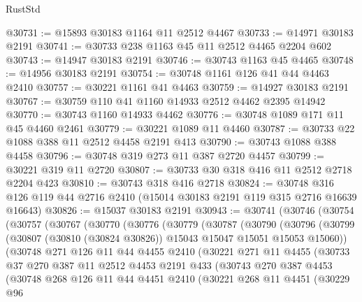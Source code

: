 \begin{lexlean}{RustStd}
\begin{coremodule}
@30731 := @15893 @30183 @1164 @11 @2512 @4467
@30733 := @14971 @30183 @2191
@30741 := @30733 @238 @1163 @45 @11 @2512 @4465 @2204 @602
@30743 := @14947 @30183 @2191
@30746 := @30743 @1163 @45 @4465
@30748 := @14956 @30183 @2191
@30754 := @30748 @1161 @126 @41 @44 @4463 @2410
@30757 := @30221 @1161 @41 @4463
@30759 := @14927 @30183 @2191
@30767 := @30759 @110 @41 @1160 @14933 @2512 @4462 @2395 @14942
@30770 := @30743 @1160 @14933 @4462
@30776 := @30748 @1089 @171 @11 @45 @4460 @2461
@30779 := @30221 @1089 @11 @4460
@30787 := @30733 @22 @1088 @388 @11 @2512 @4458 @2191 @413
@30790 := @30743 @1088 @388 @4458
@30796 := @30748 @319 @273 @11 @387 @2720 @4457
@30799 := @30221 @319 @11 @2720
@30807 := @30733 @30 @318 @416 @11 @2512 @2718 @2204 @423
@30810 := @30743 @318 @416 @2718
@30824 := @30748 @316 @126 @119 @44 @2716 @2410 (@15014 @30183 @2191 @119 @315 @2716 @16639 @16643)
@30826 := @15037 @30183 @2191
@30943 := @30741
    (@30746
      (@30754
        (@30757
          (@30767
            (@30770
              (@30776
                (@30779
                  (@30787
                    (@30790
                      (@30796
                        (@30799
                          (@30807 (@30810 (@30824 @30826)) @15043 @15047 @15051 @15053 @15060))
                        (@30748
                          @271
                          @126
                          @11
                          @44
                          @4455
                          @2410
                          (@30221
                            @271
                            @11
                            @4455
                            (@30733
                              @37
                              @270
                              @387
                              @11
                              @2512
                              @4453
                              @2191
                              @433
                              (@30743
                                @270
                                @387
                                @4453
                                (@30748
                                  @268
                                  @126
                                  @11
                                  @44
                                  @4451
                                  @2410
                                  (@30221
                                    @268
                                    @11
                                    @4451
                                    (@30229
                                      @96

\end{coremodule}
\end{lexlean}
